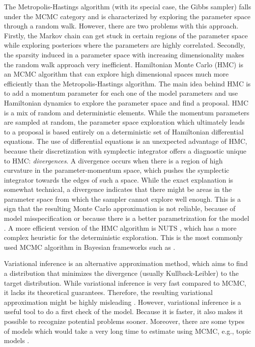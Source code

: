 The Metropolis-Hastings algorithm (with its special case, the Gibbs sampler) falls under the MCMC category and is characterized by exploring the parameter space through a random walk.
However, there are two problems with this approach.
Firstly, the Markov chain can get stuck in certain regions of the parameter space while exploring posteriors where the parameters are highly correlated.
Secondly, the sparsity induced in a parameter space with increasing dimensionality makes the random walk approach very inefficient.
Hamiltonian Monte Carlo (HMC) is an MCMC algorithm that can explore high dimensional spaces much more efficiently than the Metropolis-Hastings algorithm.
The main idea behind HMC is to add a momentum parameter for each one of the model parameters and use Hamiltonian dynamics to explore the parameter space and find a proposal.
HMC is a mix of random and deterministic elements.
While the momentum parameters are sampled at random, the parameter space exploration which ultimately leads to a proposal is based entirely on a deterministic set of Hamiltonian differential equations.
The use of differential equations is an unexpected advantage of HMC, because their discretization with symplectic integrator offers a diagnostic unique to HMC: \textit{divergences}.
A divergence occurs when there is a region of high curvature in the parameter-momentum space, which pushes the symplectic integrator towards the edges of such a space.
While the exact explanation is somewhat technical, a divergence indicates that there might be areas in the parameter space from which the sampler cannot explore well enough.
This is a sign that the resulting Monte Carlo approximation is not reliable, because of model misspecification or because there is a better parametrization for the model \citep{betancourt_conceptual_2017, neal_mcmc_2011}.
A more efficient version of the HMC algorithm is NUTS \citep{hoffman_no-u-turn_2014}, which has a more complex heuristic for the deterministic exploration.
This is the most commonly used MCMC algorithm in Bayesian frameworks such as .

Variational inference is an alternative approximation method, which aims to find a distribution that minimizes the divergence (usually Kullback-Leibler) to the target distribution.
While variational inference is very fast compared to MCMC, it lacks its theoretical guarantees.
Therefore, the resulting variational approximation might be highly misleading \citep{blei_variational_2017}.
However, variational inference is a useful tool to do a first check of the model.
Because it is faster, it also makes it possible to recognize potential problems sooner.
Moreover, there are some types of models which would take a very long time to estimate using MCMC, e.g., topic models \citep{blei_latent_2003}.


